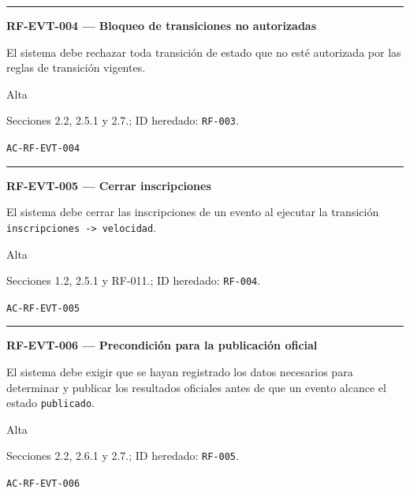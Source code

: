 \documentclass[10pt,letterpaper]{article}
\begin{document}
\vspace{0.25em}\hrule\vspace{0.65em}
\noindent\textbf{RF-EVT-004 --- Bloqueo de transiciones no autorizadas}\par
\begin{description}[style=nextline,leftmargin=3.15cm,labelwidth=2.8cm,font=\normalfont\bfseries]
\item[Obligación] El sistema debe rechazar toda transición de estado que no esté autorizada por las reglas de transición vigentes.
\item[Prioridad] Alta
\item[Procedencia] Secciones 2.2, 2.5.1 y 2.7.; ID heredado: \texttt{RF-003}.
\item[Verificación] \texttt{AC-RF-EVT-004}
\end{description}
\vspace{0.25em}\hrule\vspace{0.65em}
\noindent\textbf{RF-EVT-005 --- Cerrar inscripciones}\par
\begin{description}[style=nextline,leftmargin=3.15cm,labelwidth=2.8cm,font=\normalfont\bfseries]
\item[Obligación] El sistema debe cerrar las inscripciones de un evento al ejecutar la transición \texttt{inscripciones -> velocidad}.
\item[Prioridad] Alta
\item[Procedencia] Secciones 1.2, 2.5.1 y RF-011.; ID heredado: \texttt{RF-004}.
\item[Verificación] \texttt{AC-RF-EVT-005}
\end{description}
\vspace{0.25em}\hrule\vspace{0.65em}
\noindent\textbf{RF-EVT-006 --- Precondición para la publicación oficial}\par
\begin{description}[style=nextline,leftmargin=3.15cm,labelwidth=2.8cm,font=\normalfont\bfseries]
\item[Obligación] El sistema debe exigir que se hayan registrado los datos necesarios para determinar y publicar los resultados oficiales antes de que un evento alcance el estado \texttt{publicado}.
\item[Prioridad] Alta
\item[Procedencia] Secciones 2.2, 2.6.1 y 2.7.; ID heredado: \texttt{RF-005}.
\item[Verificación] \texttt{AC-RF-EVT-006}
\end{description}
\end{document}
